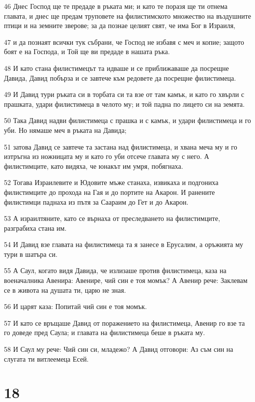 \par 46 Днес Господ ще те предаде в ръката ми; и като те поразя ще ти отнема главата, и днес ще предам труповете на филистимското множество на въздушните птици и на земните зверове; за да познае целият свят, че има Бог в Израиля,
\par 47 и да познаят всички тук събрани, че Господ не избавя с меч и копие; защото боят е на Господа, и Той ще ви предаде в нашата ръка.
\par 48 И като стана филистимецът та идваше и се приближаваше да посрещне Давида, Давид побърза и се завтече към редовете да посрещне филистимеца.
\par 49 И Давид тури ръката си в торбата си та взе от там камък, и като го хвърли с прашката, удари филистимеца в челото му; и той падна по лицето си на земята.
\par 50 Така Давид надви филистимеца с прашка и с камък, и удари филистимеца и го уби. Но нямаше меч в ръката на Давида;
\par 51 затова Давид се завтече та застана над филистимеца, и хвана меча му и го изтръгна из ножницата му и като го уби отсече главата му с него. А филистимците, като видяха, че юнакът им умря, побягнаха.
\par 52 Тогава Израилевите и Юдовите мъже станаха, извикаха и подгониха филистимците до прохода на Гая и до портите на Акарон. И ранените филистимци паднаха из пътя за Саараим до Гет и до Акарон.
\par 53 А израилтяните, като се върнаха от преследването на филистимците, разграбиха стана им.
\par 54 И Давид взе главата на филистимеца та я занесе в Ерусалим, а оръжията му тури в шатъра си.
\par 55 А Саул, когато видя Давида, че излизаше против филистимеца, каза на военачалника Авенира: Авенире, чий син е тоя момък? А Авенир рече: Заклевам се в живота на душата ти, царю не зная.
\par 56 И царят каза: Попитай чий син е тоя момък.
\par 57 И като се връщаше Давид от поражението на филистимеца, Авенир го взе та го доведе пред Саула; и главата на филистимеца беше в ръката му.
\par 58 И Саул му рече: Чий син си, младежо? А Давид отговори: Аз съм син на слугата ти витлеемеца Есей.

\chapter{18}

